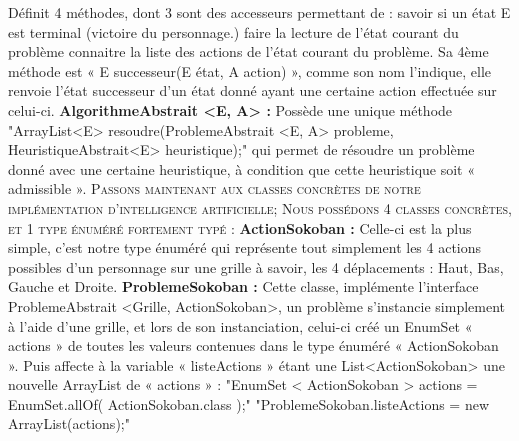 \documentclass[a4paper,12pt]{article} %
\begin{document}
Définit 4 méthodes, dont 3 sont des accesseurs permettant de :
savoir si un état E est terminal (victoire du personnage.)
faire la lecture de l’état courant du problème connaitre la liste des actions de l’état courant du problème.
\newline
Sa 4ème méthode est « E successeur(E état, A action) », comme son nom l’indique, elle renvoie l’état successeur d’un état donné ayant une certaine action effectuée sur celui-ci.
\newline\newline
\noindent
\textbf{AlgorithmeAbstrait <E, A> :}
\newline\newline
Possède une unique méthode
\newline
"ArrayList<E> resoudre(ProblemeAbstrait <E, A> probleme, HeuristiqueAbstrait<E> heuristique);"
\newline
qui permet de résoudre un problème donné avec une certaine heuristique, à condition que cette heuristique soit « admissible ». 
\newpage
\noindent
\textsc{Passons maintenant aux classes concrètes de notre implémentation d’intelligence artificielle;
Nous possédons 4 classes concrètes, et 1 type énuméré fortement typé :}
\noindent
\newline\newline
\textbf{ActionSokoban :}
\newline\newline
Celle-ci est la plus simple, c’est notre type énuméré qui représente tout simplement les 4 actions possibles d’un personnage sur une grille à savoir, les 4 déplacements : Haut, Bas, Gauche et Droite.
\noindent
\newline\newline
\textbf{ProblemeSokoban :}
\newline\newline
Cette classe, implémente l’interface ProblemeAbstrait <Grille, ActionSokoban>, un problème s’instancie simplement à l’aide d’une grille, et lors de son instanciation, celui-ci créé un EnumSet « actions » de toutes les valeurs contenues dans le type énuméré « ActionSokoban ».
\newline
Puis affecte à la variable « listeActions » étant une List<ActionSokoban> une nouvelle ArrayList de « actions » :
\newline\newline
"EnumSet < ActionSokoban > actions = EnumSet.allOf( ActionSokoban.class );"
\newline
\indent\indent "ProblemeSokoban.listeActions = new ArrayList(actions);"
\end{document}
